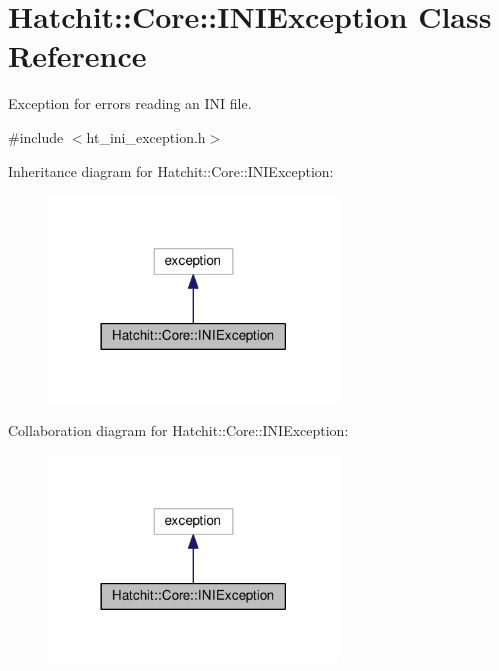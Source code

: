 \hypertarget{classHatchit_1_1Core_1_1INIException}{}\section{Hatchit\+:\+:Core\+:\+:I\+N\+I\+Exception Class Reference}
\label{classHatchit_1_1Core_1_1INIException}


Exception for errors reading an I\+NI file.  




{\ttfamily \#include $<$ht\+\_\+ini\+\_\+exception.\+h$>$}



Inheritance diagram for Hatchit\+:\+:Core\+:\+:I\+N\+I\+Exception\+:
\nopagebreak
\begin{figure}[H]
\begin{center}
\leavevmode
\includegraphics[width=218pt]{classHatchit_1_1Core_1_1INIException__inherit__graph}
\end{center}
\end{figure}


Collaboration diagram for Hatchit\+:\+:Core\+:\+:I\+N\+I\+Exception\+:
\nopagebreak
\begin{figure}[H]
\begin{center}
\leavevmode
\includegraphics[width=218pt]{classHatchit_1_1Core_1_1INIException__coll__graph}
\end{center}
\end{figure}
